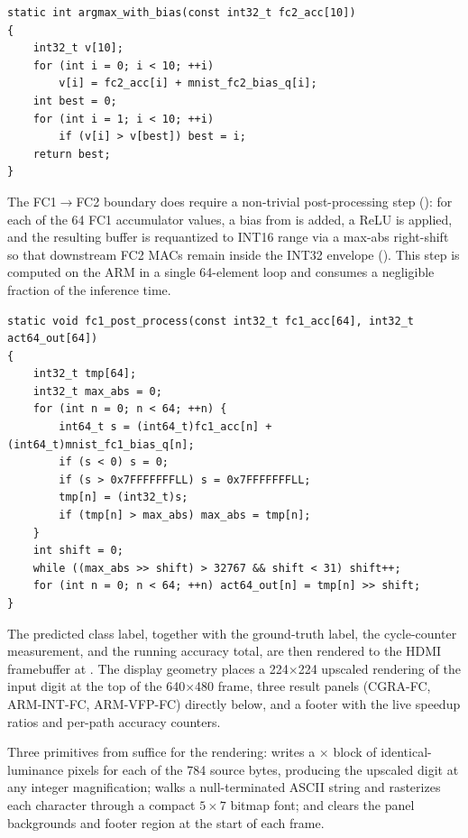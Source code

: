 \begin{lstlisting}[caption={Final classification on the ARM
(verbatim from the demo source).},label={lst:argmax}]
static int argmax_with_bias(const int32_t fc2_acc[10])
{
    int32_t v[10];
    for (int i = 0; i < 10; ++i)
        v[i] = fc2_acc[i] + mnist_fc2_bias_q[i];
    int best = 0;
    for (int i = 1; i < 10; ++i)
        if (v[i] > v[best]) best = i;
    return best;
}
\end{lstlisting}

The FC1$\rightarrow$FC2 boundary does require a non-trivial
post-processing step (): for each of the
64 FC1 accumulator values, a bias from  is
added, a ReLU is applied, and the resulting buffer is requantized to
INT16 range via a max-abs right-shift so that downstream FC2 MACs remain
inside the INT32 envelope (). This step is computed
on the ARM in a single 64-element loop and consumes a negligible
fraction of the inference time.

\begin{lstlisting}[caption={FC1$\rightarrow$FC2 post-processing
(verbatim from the demo source).},label={lst:fc1post}]
static void fc1_post_process(const int32_t fc1_acc[64], int32_t act64_out[64])
{
    int32_t tmp[64];
    int32_t max_abs = 0;
    for (int n = 0; n < 64; ++n) {
        int64_t s = (int64_t)fc1_acc[n] + (int64_t)mnist_fc1_bias_q[n];
        if (s < 0) s = 0;
        if (s > 0x7FFFFFFFLL) s = 0x7FFFFFFFLL;
        tmp[n] = (int32_t)s;
        if (tmp[n] > max_abs) max_abs = tmp[n];
    }
    int shift = 0;
    while ((max_abs >> shift) > 32767 && shift < 31) shift++;
    for (int n = 0; n < 64; ++n) act64_out[n] = tmp[n] >> shift;
}
\end{lstlisting}

The predicted class label, together with the ground-truth label, the
cycle-counter measurement, and the running accuracy total, are then
rendered to the HDMI framebuffer at . The display geometry
places a 224$\times$224 upscaled rendering of the input digit at the top
of the 640$\times$480 frame, three result panels (CGRA-FC, ARM-INT-FC,
ARM-VFP-FC) directly below, and a footer with the live speedup ratios
and per-path accuracy counters.

Three primitives from  suffice for the rendering:
 writes a
$\times$ block of identical-luminance pixels
for each of the 784 source bytes, producing the upscaled digit at any
integer magnification; 
walks a null-terminated ASCII string and rasterizes each character
through a compact $5\times7$ bitmap font; and
 clears the panel backgrounds and
footer region at the start of each frame.

